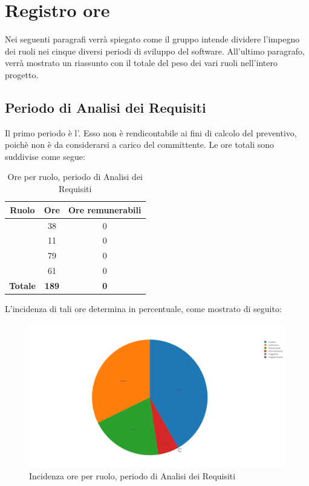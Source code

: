 \newpage
\section{Registro ore}
Nei seguenti paragrafi verrà spiegato come il gruppo intende dividere l'impegno dei ruoli nei cinque diversi periodi di sviluppo del software. All'ultimo paragrafo, verrà mostrato un riassunto con il totale del peso dei vari ruoli nell'intero progetto.

\subsection{Periodo di Analisi dei Requisiti}
Il primo periodo è l'\AdR. Esso non è rendicontabile ai fini di calcolo del preventivo, poichè non è da considerarsi a carico del committente. Le ore totali sono suddivise come segue:

\begin{table}[H]
	\begin{center}
		\begin{tabular}{|c|c|c|}
			\hline
			\textbf{Ruolo}	& \textbf{Ore}	& \textbf{Ore remunerabili} \\
			\hline
			\Res	&	38	&  0 \\
			\hline
			\Amm	&	11	&  0 \\
			\hline
			\Ana	&	79	&  0 \\
			\hline
			\Ver	&	61	&  0 \\
			\hline
			\textbf{Totale} & \textbf{189} & \textbf{0} \\
			\hline
		\end{tabular}
	\end{center}
	\caption{Ore per ruolo, periodo di Analisi dei Requisiti}
\end{table}

L'incidenza di tali ore determina in percentuale, come mostrato di seguito:
\begin{figure}[H]
	\centering
	\includegraphics[scale=0.6]{img/AnalisiRequisiti.png}
	\caption{Incidenza ore per ruolo, periodo di Analisi dei Requisiti}
\end{figure}


